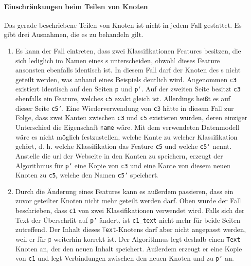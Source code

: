     \paragraph{Einschränkungen beim Teilen von Knoten}
    Das gerade beschriebene Teilen von Knoten ist nicht in jedem Fall gestattet.
    Es gibt drei Ausnahmen, die es zu behandeln gilt.

    \begin{enumerate}
        \item Es kann der Fall eintreten, dass zwei Klassifikationen Features besitzen,
        die sich lediglich im Namen eines {\childFeature}s unterscheiden,
        obwohl dieses Feature ansonsten ebenfalls identisch ist.
        In diesem Fall darf der Knoten des {\parentFeature}s nicht geteilt werden,
        was anhand eines Beispiels deutlich wird.
        Angenommen \texttt{c3} existiert identisch auf den Seiten \texttt{p} und \texttt{p'}.
        Auf der zweiten Seite besitzt \texttt{c3} ebenfalls ein Feature,
        welches \texttt{c5} exakt gleich ist.
        Allerdings heißt es auf dieser Seite \texttt{c5'}.
        Eine Wiederverwendung von \texttt{c3} hätte in diesem Fall zur Folge,
        dass zwei Kanten zwischen \texttt{c3} und \texttt{c5} existieren würden,
        deren einziger Unterschied die Eigenschaft \texttt{name} wäre.
        Mit dem verwendeten Datenmodell wäre es nicht möglich festzustellen,
        welche Kante zu welcher Klassifikation gehört,
        d. h. welche Klassifikation das Feature \texttt{c5} und welche \texttt{c5'} nennt.
        Anstelle die \gls{url} der Webseite in den Kanten zu speichern,
        erzeugt der Algorithmus für \texttt{p'} eine Kopie von \texttt{c3}
        und eine Kante von diesem neuen Knoten zu \texttt{c5},
        welche den Namen \texttt{c5'} speichert.
        \item Durch die Änderung eines Features kann es außerdem passieren,
        dass ein zuvor geteilter Knoten nicht mehr geteilt werden darf.
        Oben wurde der Fall beschrieben, dass \texttt{c1}
        von zwei Klassifikationen verwendet wird.
        Falls sich der Text der Überschrfit auf \texttt{p'} ändert,
        ist \texttt{c1\_text} nicht mehr für beide Seiten zutreffend.
        Der Inhalt dieses \texttt{Text}-Knotens darf aber nicht angepasst werden,
        weil er für \texttt{p} weiterhin korrekt ist.
        Der Algorithmus legt deshalb einen \texttt{Text}-Knoten an,
        der den neuen Inhalt speichert.
        Außerdem erzeugt er eine Kopie von \texttt{c1}
        und legt Verbindungen zwischen den neuen Knoten und zu \texttt{p'} an.

\end{enumerate}
